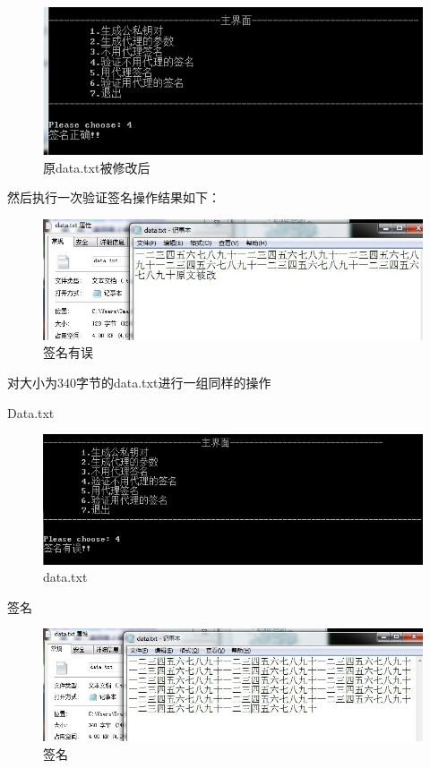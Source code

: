 \begin{figure}[H]
\centering
\includegraphics{img/13.jpg}
\caption{原data.txt被修改后}
\end{figure}

然后执行一次验证签名操作结果如下：

\begin{figure}[H]
\centering
\includegraphics{img/14.jpg}
\caption{签名有误}
\end{figure}

对大小为340字节的data.txt进行一组同样的操作

Data.txt

\begin{figure}[H]
\centering
\includegraphics{img/15.jpg}
\caption{data.txt}
\end{figure}

签名

\begin{figure}[H]
\centering
\includegraphics{img/16.jpg}
\caption{签名}
\end{figure}

